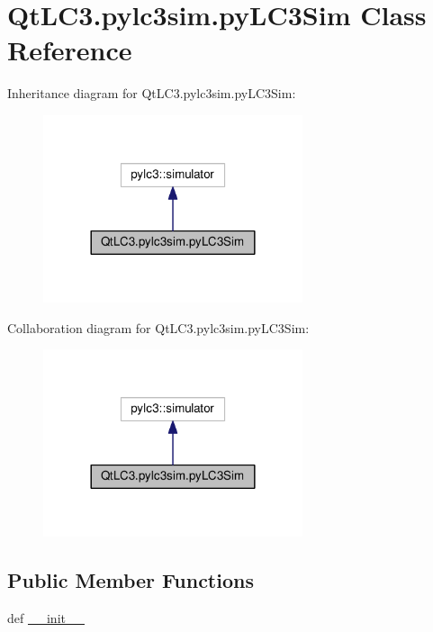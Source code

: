 \hypertarget{class_qt_l_c3_1_1pylc3sim_1_1py_l_c3_sim}{\section{Qt\-L\-C3.\-pylc3sim.\-py\-L\-C3\-Sim Class Reference}
\label{class_qt_l_c3_1_1pylc3sim_1_1py_l_c3_sim}
}


Inheritance diagram for Qt\-L\-C3.\-pylc3sim.\-py\-L\-C3\-Sim\-:
\nopagebreak
\begin{figure}[H]
\begin{center}
\leavevmode
\includegraphics[width=216pt]{class_qt_l_c3_1_1pylc3sim_1_1py_l_c3_sim__inherit__graph}
\end{center}
\end{figure}


Collaboration diagram for Qt\-L\-C3.\-pylc3sim.\-py\-L\-C3\-Sim\-:
\nopagebreak
\begin{figure}[H]
\begin{center}
\leavevmode
\includegraphics[width=216pt]{class_qt_l_c3_1_1pylc3sim_1_1py_l_c3_sim__coll__graph}
\end{center}
\end{figure}
\subsection*{Public Member Functions}
\begin{DoxyCompactItemize}
\item 
def \hyperlink{class_qt_l_c3_1_1pylc3sim_1_1py_l_c3_sim_a25625c1944d9a66775f712e7b35dcca3}{\-\_\-\-\_\-init\-\_\-\-\_\-}
\end{DoxyCompactItemize}

